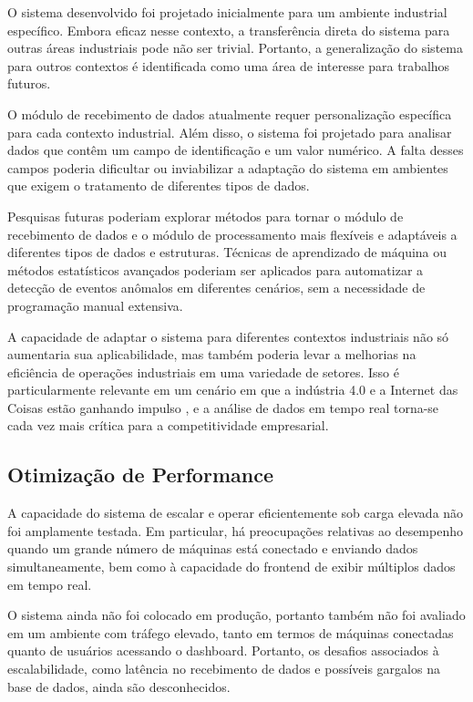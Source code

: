 O sistema desenvolvido foi projetado inicialmente para um ambiente industrial específico. Embora eficaz nesse contexto, a transferência direta do sistema para outras áreas industriais pode não ser trivial. Portanto, a generalização do sistema para outros contextos é identificada como uma área de interesse para trabalhos futuros.

O módulo de recebimento de dados atualmente requer personalização específica para cada contexto industrial. Além disso, o sistema foi projetado para analisar dados que contêm um campo de identificação e um valor numérico. A falta desses campos poderia dificultar ou inviabilizar a adaptação do sistema em ambientes que exigem o tratamento de diferentes tipos de dados.

Pesquisas futuras poderiam explorar métodos para tornar o módulo de recebimento de dados e o módulo de processamento mais flexíveis e adaptáveis a diferentes tipos de dados e estruturas. Técnicas de aprendizado de máquina ou métodos estatísticos avançados poderiam ser aplicados para automatizar a detecção de eventos anômalos em diferentes cenários, sem a necessidade de programação manual extensiva.

A capacidade de adaptar o sistema para diferentes contextos industriais não só aumentaria sua aplicabilidade, mas também poderia levar a melhorias na eficiência de operações industriais em uma variedade de setores. Isso é particularmente relevante em um cenário em que a indústria 4.0 e a Internet das Coisas estão ganhando impulso \cite{nagy2018roleImpact}, e a análise de dados em tempo real torna-se cada vez mais crítica \cite{glowalla2014processDriven} para a competitividade empresarial.

\subsection{Otimização de Performance}

A capacidade do sistema de escalar e operar eficientemente sob carga elevada não foi amplamente testada. Em particular, há preocupações relativas ao desempenho quando um grande número de máquinas está conectado e enviando dados simultaneamente, bem como à capacidade do frontend de exibir múltiplos dados em tempo real.

O sistema ainda não foi colocado em produção, portanto também não foi avaliado em um ambiente com tráfego elevado, tanto em termos de máquinas conectadas quanto de usuários acessando o dashboard. Portanto, os desafios associados à escalabilidade, como latência no recebimento de dados e possíveis gargalos na base de dados, ainda são desconhecidos.

